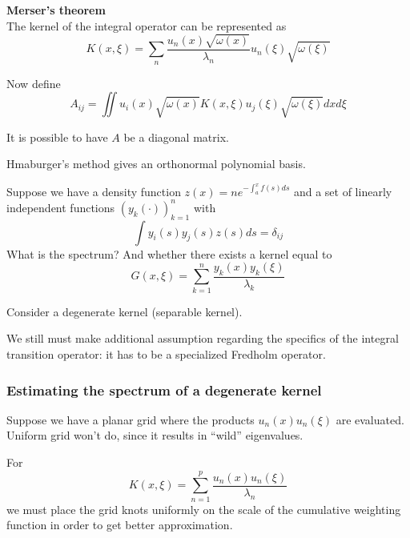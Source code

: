 \documentclass[a4paper]{article}
\newcommand{\brac}[1]{{\left ( #1 \right )}}
\begin{document}
\noindent\textbf{Merser's theorem}\hfill\\
The kernel of the integral operator can be represented as
\[K(x,\xi) = \sum_n \frac{u_n(x)\sqrt{\omega(x)} }{\lambda_n} u_n(\xi)\sqrt{\omega(\xi)} \]

Now define 
\[A_{ij} = \iint u_i(x)\sqrt{\omega(x)} K(x,\xi) u_j(\xi)\sqrt{\omega(\xi)} dxd\xi\]

It is possible to have $A$ be a diagonal matrix.

Hmaburger's method gives an orthonormal polynomial basis.

Suppose we have a density function $z(x) = ne^{-\int_a^x f(s) ds}$ and a set of linearly independent functions $\brac{y_k(\cdot)}_{k=1}^n$ with
\[\int y_i(s) y_j(s) z(s) ds = \delta_{ij}\]
What is the spectrum? And whether there exists a kernel equal to
\[G(x,\xi)=\sum_{k=1}^n \frac{y_k(x)y_k(\xi)}{\lambda_k}\]

Consider a degenerate kernel (separable kernel).

We still must make additional assumption regarding the specifics of the integral transition operator: it has to be a specialized Fredholm operator.


\subsubsection{Estimating the spectrum of a degenerate kernel} %
\label{ssub:estimating_the_spectrum_of_a_degenerate_kernel}

Suppose we have a planar grid where the products $u_n(x) u_n(\xi)$ are evaluated. Uniform grid won't do, since it results in ``wild'' eigenvalues.

For \[K(x,\xi) = \sum_{n=1}^p \frac{u_n(x) u_n(\xi)}{\lambda_n}\]
we must place the grid knots uniformly on the scale of the cumulative weighting function in order to get better approximation.





\end{document}
